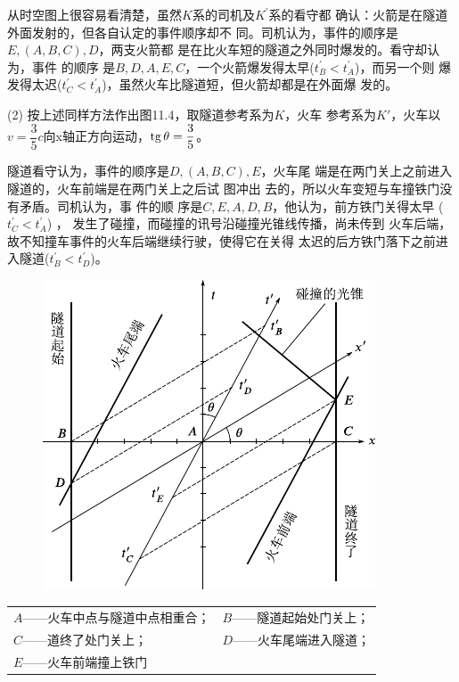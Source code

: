 从时空图上很容易看清楚，虽然$ K $系的司机及$ K ^ { \prime } $系的看守都
确认：火箭是在隧道外面发射的，但各自认定的事件顺序却不
同。司机认为，事件的顺序是$ E, (A, B, C), D $，两支火箭都
是在比火车短的隧道之外同时爆发的。看守却认为，事件
的顺序
是$ B, D, A, E, C $，一个火箭爆发得太早($ t _ { B } ^ { \prime } < t _ { A } ^ { \prime } $)，而另一个则
爆发得太迟($ t _ { C } ^ { \prime } < t _ { A } ^ { \prime } $)，虽然火车比隧道短，但火箭却都是在外面爆
发的。

(2) 按上述同样方法作出图11.4，取隧道参考系为$ K $，火车
参考系为$ K' $，火车以$ v = \dfrac { 3 } { 5 } c $向x轴正方向运动，$  \operatorname{tg} \theta = \dfrac { 3 } { 5 }  $。

隧道看守认为，事件的顺序是$ D, (A, B, C), E $，火车尾
端是在两门关上之前进入隧道的，火车前端是在两门关上之后试
图冲出
去的，所以火车变短与车撞铁门没有矛盾。司机认为，事
件的顺\clearpage\noindent
序是$ C, E, A, D, B $，他认为，前方铁门关得太早
($ t _ { C } ^ { \prime } < t _ { A } ^ { \prime } $)  ，
发生了碰撞，而碰撞的讯号沿碰撞光锥线传播，尚未传到
火车后端，故不知撞车事件的火车后端继续行驶，使得它在关得
太迟的后方铁门落下之前进入隧道($ t _ { B } ^ { \prime } < t _ { D } ^ { \prime } $)。

\begin{figure}[h]
    \centering
    \includegraphics{figure/fig11.04}
    \caption{}
    \label{fig:11.04}
\end{figure}

\begin{center}
    \begin{tabular}{ll}
        $ A $——火车中点与隧道中点相重合； & $ B $——隧道起始处门关上； \\
        $ C $——道终了处门关上； & $ D $——火车尾端进入隧道； \\
        $ E $——火车前端撞上铁门 &  \\
    \end{tabular}
\end{center}

